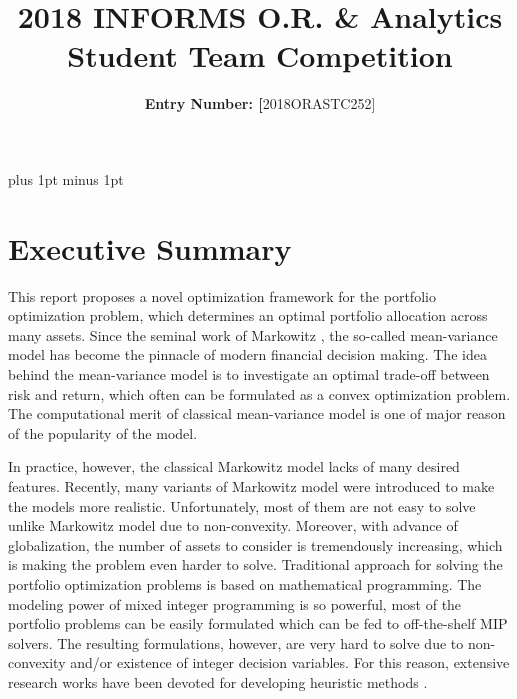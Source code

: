 \documentclass[11pt]{article}
\title{2018 INFORMS O.R. {\&} Analytics Student Team Competition}
\author{\textbf{Entry Number: [}2018ORASTC252]
}
\date{}
\begin{document}
\maketitle


\baselineskip16pt plus 1pt minus 1pt



\section*{Executive Summary}

This report proposes a novel optimization framework for the portfolio optimization problem, which determines an optimal portfolio allocation across many assets. Since the seminal work of Markowitz \citep{markowitz1952portfolio}, the so-called mean-variance model has become the pinnacle of modern financial decision making. The idea behind the mean-variance model is to investigate an optimal trade-off between risk and return, which often can be formulated as a convex optimization problem. The computational merit of classical mean-variance model is one of major reason of the popularity of the model. 

In practice, however, the classical Markowitz model lacks of many desired features. 
Recently, many variants of Markowitz model were introduced to make the models more realistic. Unfortunately, most of them are not easy to solve unlike Markowitz model due to non-convexity. Moreover, with advance of globalization, the number of assets to consider is tremendously increasing, which is making the problem even harder to solve. Traditional approach for solving the portfolio optimization problems is based on mathematical programming. The modeling power of mixed integer programming is so powerful, most of the portfolio problems can be easily formulated which can be fed to off-the-shelf MIP solvers. The resulting formulations, however, are very hard to solve due to non-convexity and/or existence of integer decision variables. For this reason, extensive research works have been devoted for developing heuristic methods \citep{Cesarone:2012ex,WoodsideOriakhi:2011ie}. 
\end{document}
